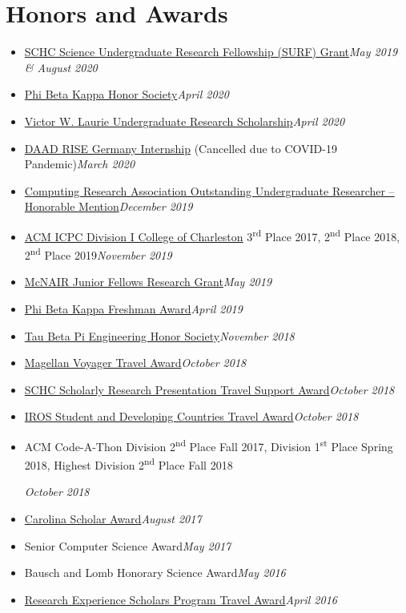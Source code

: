 \documentclass[\ifdefined\cv10pt\else10pt\fi,letterpaper]{moderncv}
\newcommand{\cvonly}[1]{\ifdefined\cv#1\fi\ignorespaces}
\renewcommand{\cvitem}[2]{\item {#1}\hfill\textit{#2}}
\newcommand{\st}{\textsuperscript{st}\xspace}
\newcommand{\nd}{\textsuperscript{nd}\xspace}
\newcommand{\rd}{\textsuperscript{rd}\xspace}
\let\oldsection\section
\renewcommand{\section}[1]{\vspace*{-1.3ex}\oldsection{#1}\vspace*{-0.5ex}}
\begin{document}
\section{Honors and Awards}
\begin{itemize}
	\cvitem{\href{https://www.sc.edu/study/colleges_schools/honors_college/internal/beyond_the_classroom/undergraduate_research/surf_and_exploration_grants/index.php}{SCHC Science Undergraduate Research Fellowship (SURF) Grant}}{May 2019 \& August 2020}
	\cvitem{\href{https://www.pbk.org/}{Phi Beta Kappa Honor Society}}{April 2020}
	\cvitem{\href{https://sc.edu/study/colleges_schools/artsandsciences/mathematics/study/awards_scholarships/}{Victor W. Laurie Undergraduate Research Scholarship}}{April 2020}
	\cvitem{\href{https://www.daad.de/rise/en/rise-germany/}{DAAD RISE Germany Internship} (Cancelled due to COVID-19 Pandemic)}{March 2020}
	\cvitem{\href{https://cra.org/about/awards/outstanding-undergraduate-researcher-award/}{Computing Research Association Outstanding Undergraduate Researcher -- Honorable Mention}}{December 2019}  %
	\cvonly{\cvitem{\href{http://compsci.cofc.edu/ACM-ICPC.php}{ACM ICPC Division I College of Charleston} 3\rd Place 2017, 2\nd Place 2018, 2\nd Place 2019}{November 2019}}
	\cvitem{\href{https://sc.edu/about/offices_and_divisions/undergraduate_research/apply_for_funding/other_money_opportunities/cec_mcnair-research-fellows-summer/index.php}{McNAIR Junior Fellows Research Grant}}{May 2019}  %
	\cvitem{\href{https://www.sc.edu/uofsc/announcements/posts/2019/04/university_awards_day_2019.php}{Phi Beta Kappa Freshman Award}}{April 2019}
	\cvitem{\href{https://tbp.org/}{Tau Beta Pi Engineering Honor Society}}{November 2018}
	\cvonly{
	\cvitem{\href{https://www.sc.edu/about/offices_and_divisions/undergraduate_research/apply_for_funding/our_funding/conference-travel/index.php}{Magellan Voyager Travel Award}}{October 2018}
	\cvitem{\href{https://www.sc.edu/study/colleges_schools/honors_college/experience/undergraduate_research/index.php}{SCHC Scholarly Research Presentation Travel Support Award}}{October 2018}
	\cvitem{\href{https://www.iros2018.org/travel-grants}{IROS Student and Developing Countries Travel Award}}{October 2018}
	}
	\cvonly{\cvitem{\parbox[t]{0.75\linewidth}{ACM Code-A-Thon Division 2\nd Place Fall 2017, Division 1\st Place Spring 2018, Highest Division 2\nd Place Fall 2018}\vspace*{0.6ex}}{October 2018}}
	\cvitem{\href{https://sc.edu/about/offices_and_divisions/undergraduate_admissions/honors_and_scholars_programs/top_scholars/}{Carolina Scholar Award}}{August 2017}
	\cvonly{\cvitem{Senior Computer Science Award}{May 2017}}
	\cvonly{\cvitem{Bausch and Lomb Honorary Science Award}{May 2016}}
	\cvonly{\cvitem{\href{https://www.scgssm.org/residential/academics/senior-research}{Research Experience Scholars Program Travel Award}}{April 2016}}
\end{itemize}
\end{document}
